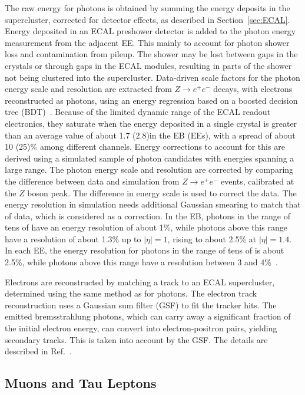 The raw energy for photons is obtained by summing the energy deposits in the supercluster, corrected for detector effects, as described in Section~\ref{sec:ECAL}. Energy deposited in an ECAL preshower detector is added to the photon energy measurement from the adjacent EE. This  mainly to account for photon shower loss and contamination from pileup. The shower may be lost between gaps in the crystals or through gaps in the ECAL modules, resulting in parts of the shower not being clustered into the supercluster. Data-driven scale factors for the photon energy scale and resolution are extracted from $Z \to e^+e^-$ decays, with electrons reconstructed as photons, using an energy regression based on a boosted decision tree (BDT)~\cite{CMS:EGM-14-001}. Because of the limited dynamic range of the ECAL readout electronics, they saturate when the energy deposited in a single crystal is greater than an average value of about 1.7 (2.8)\TeV in the EB (EEs), with a spread of about 10 (25)\% among different channels. Energy corrections to account for this are derived using a simulated sample of photon candidates with energies spanning a large range. The photon energy scale and resolution are corrected by comparing the difference between data and simulation from $Z \to e^+e^-$ events, calibrated at the $Z$ boson peak. The difference in energy scale is used to correct the data. The energy resolution in simulation needs additional Gaussian smearing to match that of data, which is considered as a correction. In the EB, photons in the range of tens of {\GeVns} have an energy resolution of about 1\%, while photons above this range have a resolution of about 1.3\% up to $|\eta| = 1$, rising to about 2.5\% at $|\eta| = 1.4$. In each EE, the energy resolution for photons in the range of tens of {\GeVns} is about 2.5\%, while photons above this range have a resolution between 3 and 4\%~\cite{CMS:EGM-14-001}.

Electrons are reconstructed by matching a track to an ECAL supercluster, determined using the same method as for photons. The electron track reconstruction uses a Gaussian sum filter (GSF) to fit the tracker hits. The emitted bremsstrahlung photons, which can carry away a significant fraction of the initial electron energy, can convert into electron-positron pairs, yielding secondary tracks. This is taken into account by the GSF. The details are described in Ref.~\cite{Khachatryan:2015hwa}.


\subsection{Muons and Tau Leptons}

